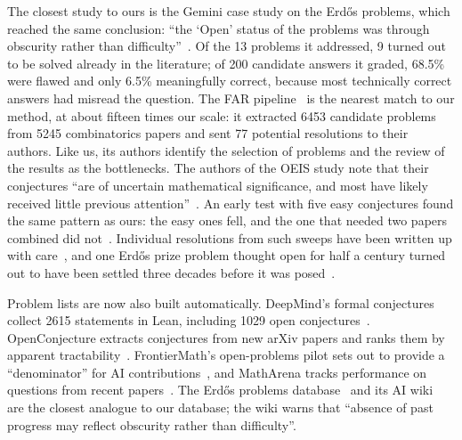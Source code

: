 \documentclass[11pt]{amsart}
\begin{document}
The closest study to ours is the Gemini case study on the Erdős problems, which
reached the same conclusion: ``the `Open' status of the problems was through
obscurity rather than difficulty''~\cite{feng}. Of the 13 problems it
addressed, 9 turned out to be solved already in the literature; of 200
candidate answers it graded, 68.5\% were flawed and only 6.5\% meaningfully
correct, because most technically correct answers had misread the question. The
FAR pipeline~\cite{far} is the nearest match to our method, at about fifteen
times our scale: it extracted 6453 candidate problems from 5245 combinatorics
papers and sent 77 potential resolutions to their authors. Like us, its authors
identify the selection of problems and the review of the results as the
bottlenecks. The authors of the OEIS study note that their conjectures ``are of
uncertain mathematical significance, and most have likely received little
previous attention''~\cite{adamczewski}. An early test with five easy
conjectures found the same pattern as ours: the easy ones fell, and the one
that needed two papers combined did not~\cite{godel}. Individual resolutions
from such sweeps have been written up with
care~\cites{sothanaphan,alexeevshort}, and one Erdős prize problem thought open
for half a century turned out to have been settled three decades before it was
posed~\cite{alexeevmixon}.

Problem lists are now also built automatically. DeepMind's formal conjectures
collect 2615 statements in Lean, including 1029 open
conjectures~\cite{formalconj}. OpenConjecture extracts conjectures from new
arXiv papers and ranks them by apparent tractability~\cite{openconjecture}.
FrontierMath's open-problems pilot sets out to provide a ``denominator'' for AI
contributions~\cite{fmop}, and MathArena tracks performance on questions from
recent papers~\cite{matharena}. The Erdős problems database~\cite{erdos} and
its AI wiki~\cite{erdos-wiki} are the closest analogue to our database; the
wiki warns that ``absence of past progress may reflect obscurity rather than
difficulty''.
\end{document}
